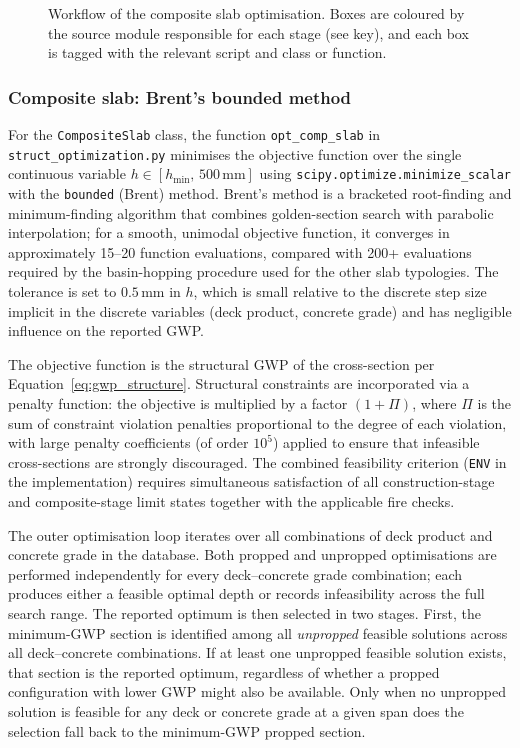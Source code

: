 \begin{figure}[p]
  \centering
  \resizebox{\textwidth}{!}{}
  \caption{Workflow of the composite slab optimisation. Boxes are coloured by the source module responsible for each stage (see key), and each box is tagged with the relevant script and class or function.}
  \label{fig:code_flowchart}
\end{figure}

\subsubsection*{Composite slab: Brent's bounded method}
For the \texttt{CompositeSlab} class, the function \texttt{opt\_comp\_slab} in \texttt{struct\_optimization.py} minimises the objective function over the single continuous variable $h \in [h_\mathrm{min},\, 500\,\mathrm{mm}]$ using \texttt{scipy.optimize.minimize\_scalar} with the \texttt{bounded} (Brent) method. Brent's method is a bracketed root-finding and minimum-finding algorithm that combines golden-section search with parabolic interpolation; for a smooth, unimodal objective function, it converges in approximately 15--20 function evaluations, compared with 200+ evaluations required by the basin-hopping procedure used for the other slab typologies. The tolerance is set to $0.5$\,mm in $h$, which is small relative to the discrete step size implicit in the discrete variables (deck product, concrete grade) and has negligible influence on the reported GWP.

The objective function is the structural GWP of the cross-section per Equation~\eqref{eq:gwp_structure}. Structural constraints are incorporated via a penalty function: the objective is multiplied by a factor $(1 + \Pi)$, where $\Pi$ is the sum of constraint violation penalties proportional to the degree of each violation, with large penalty coefficients (of order $10^5$) applied to ensure that infeasible cross-sections are strongly discouraged. The combined feasibility criterion (\texttt{ENV} in the implementation) requires simultaneous satisfaction of all construction-stage and composite-stage limit states together with the applicable fire checks.

The outer optimisation loop iterates over all combinations of deck product and concrete grade in the database. Both propped and unpropped optimisations are performed independently for every deck--concrete grade combination; each produces either a feasible optimal depth or records infeasibility across the full search range. The reported optimum is then selected in two stages. First, the minimum-GWP section is identified among all \emph{unpropped} feasible solutions across all deck--concrete combinations. If at least one unpropped feasible solution exists, that section is the reported optimum, regardless of whether a propped configuration with lower GWP might also be available. Only when no unpropped solution is feasible for any deck or concrete grade at a given span does the selection fall back to the minimum-GWP propped section.


